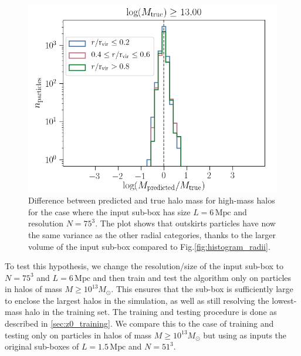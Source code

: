 \documentclass[11pt]{article}
\begin{document}
\begin{figure}[t]
	\centering
	\includegraphics[width=0.8\columnwidth]{z0/predictions_mass_and_radius_bins_6Mpc}
	\caption{Difference between predicted and true halo mass for high-mass halos for the case where the input sub-box has size $L=6\, \mathrm{Mpc}$ and resolution $N=75^3$. The plot shows that outskirts particles have now the same variance as the other radial categories, thanks to the larger volume of the input sub-box compared to Fig.\ref{fig:histogram_radii}.}
	\label{radial_cat_6mpc}
\end{figure}

To test this hypothesis, we change the resolution/size of the input sub-box to $N=75^3$ and $L=6\, \mathrm{Mpc}$ and then train and test the algorithm only on particles in halos of mass $M \geq 10^{13} M_{\odot}$. This ensures that the sub-box is sufficiently large to enclose the largest halos in the simulation, as well as still resolving the lowest-mass halo in the training set. The training and testing procedure is done as described in \ref{sec:z0_training}. We compare this to the case of training and testing only on particles in halos of mass $M \geq 10^{13} M_{\odot}$ but using as inputs the original sub-boxes of $L=1.5\, \mathrm{Mpc}$ and $N=51^3$.
\end{document}

